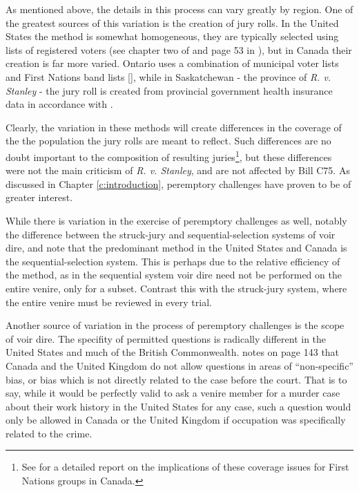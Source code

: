 As mentioned above, the details in this process can vary greatly by region. One of the greatest sources of this variation is the
creation of jury rolls. In the United States the method is somewhat homogeneous, they are typically selected using lists of
registered voters (see chapter two of \cite{vandykejurysel} and page 53 in \cite{hansvidjudging}), but in Canada their creation is
far more varied. Ontario uses a combination of municipal voter lists and First Nations band lists [\cite{ontariojuryroll}],
while in Saskatchewan - the province of \textit{R. v. Stanley} - the jury roll is created from provincial government health
insurance data in accordance with \cite{saskjuryact}.

Clearly, the variation in these methods will create differences in the coverage of the the population the jury rolls are meant to
reflect. Such differences are no doubt important to the composition of resulting juries\footnote{See \cite{iacobuccireport} for a
  detailed report on the implications of these coverage issues for First Nations groups in Canada.}, but these differences were not
the main criticism of \textit{R. v. Stanley}, and are not affected by Bill C75. As discussed in Chapter \ref{c:introduction},
peremptory challenges have proven to be of greater interest.

While there is variation in the exercise of peremptory challenges as well, notably the difference between the struck-jury and
sequential-selection systems of voir dire, \cite{ford2010} and \cite{vandykejurysel} note that the predominant method in the
United States and Canada is the sequential-selection system. This is perhaps due to the relative efficiency of the method, as in
the sequential system voir dire need not be performed on the entire venire, only for a subset. Contrast this with the struck-jury
system, where the entire venire must be reviewed in every trial.

Another source of variation in the process of peremptory challenges is the scope of voir dire. The specifity of permitted
questions is radically different in the United States and much of the British Commonwealth. \cite{vandykejurysel} notes on page
143 that Canada and the United Kingdom do not allow questions in areas of ``non-specific'' bias, or bias which is not directly
related to the case before the court. That is to say, while it would be perfectly valid to ask a venire member for a murder case
about their work history in the United States for any case, such a question would only be allowed in Canada or the United Kingdom
if occupation was specifically related to the crime.

